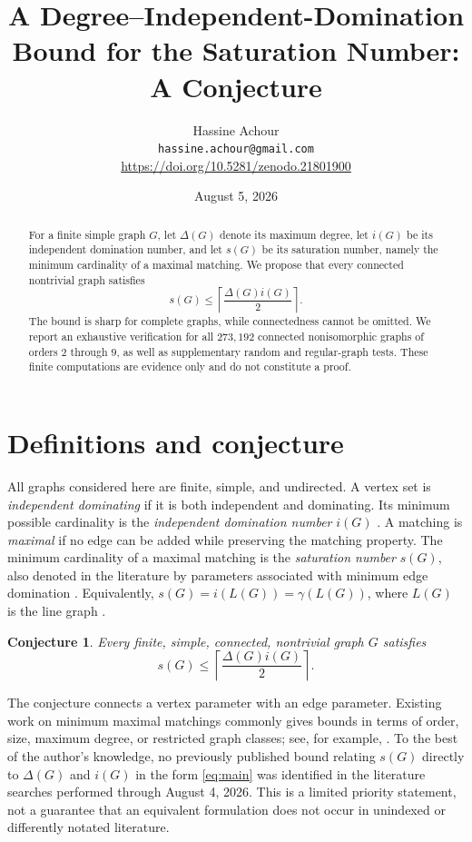 \documentclass[11pt]{article}
\title{A Degree--Independent-Domination Bound for the Saturation Number: A Conjecture}
\author{Hassine Achour\\\texttt{hassine.achour@gmail.com}\\
\small\url{https://doi.org/10.5281/zenodo.21801900}}
\date{August 5, 2026}
\newtheorem{conjecture}{Conjecture}
\newcommand{\sat}{s}
\begin{document}
\maketitle

\begin{abstract}
For a finite simple graph $G$, let $\Delta(G)$ denote its maximum degree, let $i(G)$ be its independent domination number, and let $\sat(G)$ be its saturation number, namely the minimum cardinality of a maximal matching. We propose that every connected nontrivial graph satisfies
\[
  \sat(G)\leq \left\lceil\frac{\Delta(G)i(G)}{2}\right\rceil.
\]
The bound is sharp for complete graphs, while connectedness cannot be omitted. We report an exhaustive verification for all $273{,}192$ connected nonisomorphic graphs of orders $2$ through $9$, as well as supplementary random and regular-graph tests. These finite computations are evidence only and do not constitute a proof.
\end{abstract}

\section{Definitions and conjecture}
All graphs considered here are finite, simple, and undirected. A vertex set is \emph{independent dominating} if it is both independent and dominating. Its minimum possible cardinality is the \emph{independent domination number} $i(G)$ \cite{goddard2013}. A matching is \emph{maximal} if no edge can be added while preserving the matching property. The minimum cardinality of a maximal matching is the \emph{saturation number} $\sat(G)$, also denoted in the literature by parameters associated with minimum edge domination \cite{yannakakis1980,tavakoli2023}. Equivalently, $\sat(G)=i(L(G))=\gamma(L(G))$, where $L(G)$ is the line graph \cite[Theorem~4.1]{tavakoli2023}.

\begin{conjecture}\label{conj:main}
Every finite, simple, connected, nontrivial graph $G$ satisfies
\begin{equation}\label{eq:main}
 \boxed{\quad \sat(G)\leq \left\lceil\frac{\Delta(G)i(G)}{2}\right\rceil.\quad}
\end{equation}
\end{conjecture}

The conjecture connects a vertex parameter with an edge parameter. Existing work on minimum maximal matchings commonly gives bounds in terms of order, size, maximum degree, or restricted graph classes; see, for example, \cite{baste2019,cames2020}. To the best of the author's knowledge, no previously published bound relating $\sat(G)$ directly to $\Delta(G)$ and $i(G)$ in the form \eqref{eq:main} was identified in the literature searches performed through August 4, 2026. This is a limited priority statement, not a guarantee that an equivalent formulation does not occur in unindexed or differently notated literature.
\end{document}

